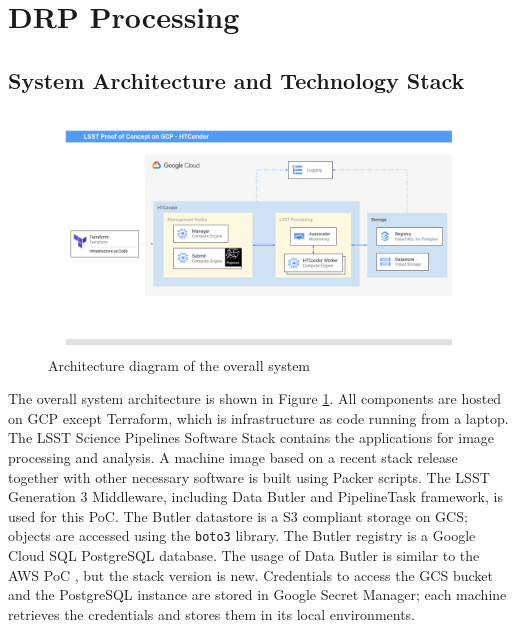 
\section{DRP Processing} \label{sec:drp}
\subsection{System Architecture and Technology Stack}

\begin{figure}[h]
\centering
\includegraphics[width=1.0\textwidth]{HTCondor_Architecture.pdf}
\caption{Architecture diagram of the overall system}
\label{fig:architecture}
\end{figure}

The overall system architecture is shown in Figure \ref{fig:architecture}.
All components are hosted on GCP except Terraform, which is infrastructure as code running from a laptop.
The LSST Science Pipelines Software Stack contains the applications for image processing and analysis.
A machine image based on a recent stack release together with other necessary software is built using Packer scripts.
The LSST Generation 3 Middleware, including Data Butler and PipelineTask framework, is used for this PoC.
The Butler datastore is a S3 compliant storage on GCS; objects are accessed using the \texttt{boto3} library.
The Butler registry is a Google Cloud SQL PostgreSQL database.
The usage of Data Butler is similar to the AWS PoC , but the stack version is new.
Credentials to access the GCS bucket and the PostgreSQL instance are stored in Google Secret Manager; each machine retrieves the credentials and stores them in its local environments.


